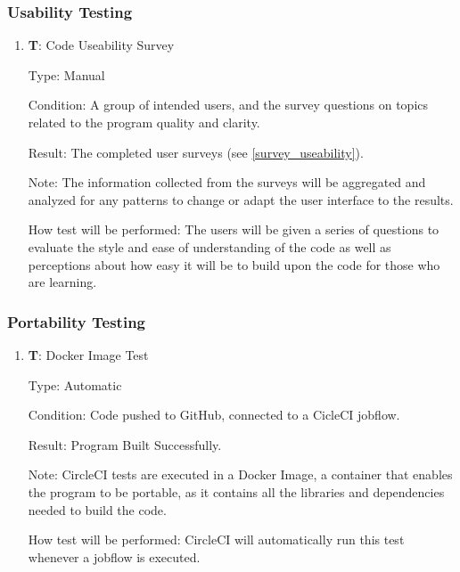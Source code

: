 \documentclass[12pt, titlepage]{article}
\newcounter{testnum} %
\begin{document}
\subsubsection{Usability Testing}

\begin{enumerate}

  \item{\textbf{T\thetestnum \label{T_useSurvey}}: Code Useability Survey\\}
            
  Type: Manual
            
  Condition: A group of intended users, and the survey questions on topics related 
  to the program quality and clarity.
            
  Result: The completed user surveys (see \ref{survey_useability}).
            
  Note: The information collected from the surveys
  will be aggregated and analyzed for any patterns to
  change or adapt the user interface to the results.
            
  How test will be performed: The users will be given a series of questions to evaluate 
  the style and ease of understanding of the code as well as perceptions about how easy it will 
  be to build upon the code for those who are learning.
\end{enumerate} 

\subsubsection{Portability Testing}

\begin{enumerate}

  \item{\textbf{T\thetestnum \label{T_dockerImage}}: Docker Image Test\\}
            
  Type: Automatic
            
  Condition: Code pushed to GitHub, connected to a CicleCI jobflow.
            
  Result: Program Built Successfully.
            
  Note: CircleCI tests are executed in a Docker Image, a container that enables the program to be portable,
  as it contains all the libraries and dependencies needed to build the code.
            
  How test will be performed: CircleCI will automatically run this test whenever a jobflow is executed.
\end{enumerate} 
\end{document}
